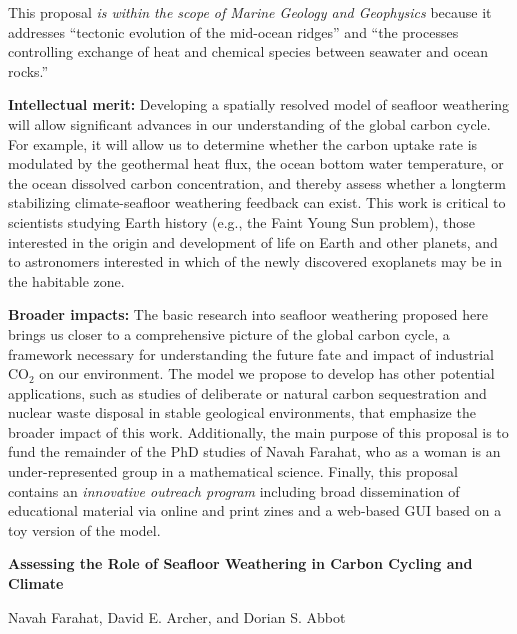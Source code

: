 \documentclass[authoryear,round,12pt]{article}
\begin{document}
This proposal \textit{is within the scope of Marine Geology and
  Geophysics} because it addresses ``tectonic evolution of the
mid-ocean ridges'' and ``the processes controlling exchange of heat
and chemical species between seawater and ocean rocks.''

\textbf{Intellectual merit:} Developing a spatially resolved model of
seafloor weathering will allow significant advances in our
understanding of the global carbon cycle. For example, it will allow
us to determine whether the carbon uptake rate is modulated by the
geothermal heat flux, the ocean bottom water temperature, or the ocean dissolved carbon concentration, and thereby
assess whether a longterm stabilizing climate-seafloor weathering
feedback can exist. This work is critical to scientists studying Earth
history (e.g., the Faint Young Sun problem), those interested in the
origin and development of life on Earth and other planets, and to
astronomers interested in which of the newly discovered exoplanets may
be in the habitable zone.



\textbf{Broader impacts:} The basic research into seafloor weathering
proposed here brings us closer to a comprehensive picture of the
global carbon cycle, a framework necessary for understanding the
future fate and impact of industrial CO$_2$ on our environment.  The model
we propose to develop has other potential applications, such as
studies of deliberate or natural carbon sequestration and nuclear waste disposal in stable
geological environments, that emphasize the broader impact of this
work. Additionally, the main purpose of this proposal is to fund the
remainder of the PhD studies of Navah Farahat, who as a woman is 
an under-represented group in a
mathematical science. Finally, this proposal contains an
\textit{innovative outreach program} including broad dissemination of
educational material via online and print zines and a web-based GUI
based on a toy version of the model.



\newpage

\setcounter{page}{1}

\begin{center}
 \textbf{\Large Assessing the Role of Seafloor Weathering in Carbon Cycling and Climate }

 \bigskip
 
Navah Farahat, David E. Archer, and Dorian S. Abbot
\end{center}
\end{document}
